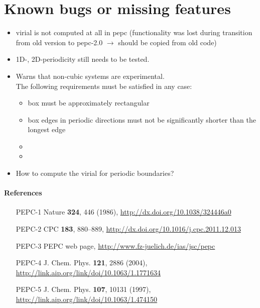 \section*{Known bugs or missing features}
\begin{itemize}
  \item virial is not computed at all in pepc (functionality was lost during transition from old version to pepc-2.0 $\longrightarrow$ should be copied from old code)
  \item 1D-, 2D-periodicity still needs to be tested.
  \item Warns that non-cubic systems are experimental.\\
      The following requirements must be satisfied in any case:
      \begin{itemize}
        \item box must be approximately rectangular
        \item box edges in periodic directions must not be significantly shorter than the longest edge
        \item {}
        \item {}
      \end{itemize}
  \item How to compute the virial for periodic boundaries?
\end{itemize}

\paragraph{References}
\begin{footnotesize}
\begin{itemize}
  \item[PEPC-1] Nature \textbf{324}, 446 (1986), \url{http://dx.doi.org/10.1038/324446a0}
  \item[PEPC-2] CPC \textbf{183}, 880--889, \url{http://dx.doi.org/10.1016/j.cpc.2011.12.013}
  \item[PEPC-3] PEPC web page, \url{http://www.fz-juelich.de/ias/jsc/pepc}
  \item[PEPC-4] J. Chem. Phys. \textbf{121}, 2886 (2004), \url{http://link.aip.org/link/doi/10.1063/1.1771634}
  \item[PEPC-5] J. Chem. Phys. \textbf{107}, 10131 (1997), \url{http://link.aip.org/link/doi/10.1063/1.474150}
\end{itemize}
\end{footnotesize}



